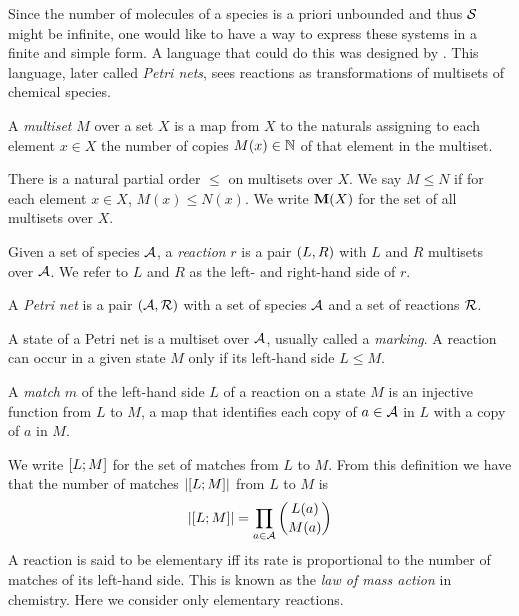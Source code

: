 Since the number of molecules of a species
is a priori unbounded and thus $\mathcal{S}$ might be infinite,
one would like to have a way to express
these systems in a finite and simple form.
A language that could do this was designed by \citet{petri}.
This language, later called \emph{Petri nets},
sees reactions as transformations of
multisets of chemical species.

\begin{definition}
  A \emph{multiset} $M$ over a set $X$ is a map from $X$ to
  the naturals assigning to each element $x \in X$
  the number of copies $M(x) \in \mathbb{N}$ of that element
  in the multiset.
\end{definition}

There is a natural partial order $\leqslant$ on multisets over $X$.
We say $M \leqslant N$ if for each element $x \in X$,
$M(x) \leqslant N(x)$.
We write $\mathbf{M}(X)$ for the set of all multisets over $X$.

\begin{definition}
  Given a set of species $\mathcal{A}$,
  a \emph{reaction} $r$ is a pair $\left(L,R\right)$
  with $L$ and $R$ multisets over $\mathcal{A}$.
  We refer to $L$ and $R$ as the left- and right-hand side of $r$.
\end{definition}

\begin{definition}%
  A \emph{Petri net} is a pair $\left(\mathcal{A}, \mathcal{R}\right)$ with
  a set of species $\mathcal{A}$ and a set of reactions $\mathcal{R}$.
\end{definition}

A state of a Petri net is a multiset over $\mathcal{A}$,
usually called a \emph{marking}.
A reaction can occur in a given state $M$ only if
its left-hand side $L \leqslant M$.

\begin{definition}
  A \emph{match} $m$ of the left-hand side $L$ of a reaction
  on a state $M$ is an injective function from $L$ to $M$,
  \ie a map that identifies each copy of $a \in \mathcal{A}$ in $L$
  with a copy of $a$ in $M$.
\end{definition}

We write $\left[L;M\right]$ for the set of matches from $L$ to $M$.
From this definition we have that the number of matches
$\left\lvert \left[L;M\right] \right\rvert$ from $L$ to $M$ is
\[ \left\lvert \left[L;M\right] \right\rvert = \prod_{a \in \mathcal{A}} \binom{L(a)}{M(a)} \]
A reaction is said to be elementary iff its rate is
proportional to the number of matches of its left-hand side.
This is known as the \emph{law of mass action} in chemistry.
Here we consider only elementary reactions.

